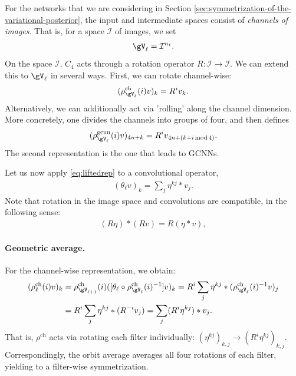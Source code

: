 \documentclass{article}
\begin{document}
For the networks that we are considering in Section \ref{sec:symmetrization-of-the-variational-posterior}, the input and intermediate spaces consist of \emph{channels of images}. That is, for a space $\mathcal{I}$ of images, we set
\begin{align}
    \gV_\ell = \mathcal{I}^{n_\ell}.
\end{align}
On the space $\mathcal{I}$, $C_4$ acts through a rotation operator $R:\mathcal{I}\to \mathcal{I}$. We can extend this to $\gV_\ell$ in several ways. First, we can rotate channel-wise:
\begin{align}
    (\rho_{\gV_\ell}^{\mathrm{ch}} (i) v)_k = R^{i} v_k.
\end{align}
Alternatively, we can additionally act via 'rolling' along the channel dimension. More concretely, one divides the channels into groups of four, and then defines
\begin{align}
    (\rho_{\gV_\ell}^{\mathrm{gcnn}}(i) v)_{4n + k} = R^iv_{4n +(k+i \, \mathrm{mod} \, 4)}.
\end{align}
The second representation is the one that leads to GCNNs.

Let us now apply \eqref{eq:liftedrep} to a convolutional operator,
\begin{align}
    (\theta_\ell v)_k = \sum_j \eta^{kj}*v_j.
\end{align}
Note that rotation in the image space and convolutions are compatible, in the following sense:
\begin{align}
    (R\eta)*(Rv) = R(\eta*v),
\end{align}

\paragraph{Geometric average.} For the channel-wise representation, we obtain:
\begin{align}
    (\rho^{\mathrm{ch}}_{\ell}(i)v)_k &= \rho_{\gV_{\ell+1}}^{\mathrm{ch}}(i) ([\theta_\ell \circ \rho_{\gV_\ell}^{\mathrm{ch}}(i)^{-1}]v)_k = R^i\sum_{j}\eta^{kj}*(\rho_{\gV_\ell}^{\mathrm{ch}}(i)^{-1}v)_j \\
    &= R^i\sum_{j}\eta^{kj}*(R^{-i}v_j) = \sum_{j}(R^i\eta^{kj})*v_j. 
\end{align}
That is, $\rho^{\mathrm{ch}}$ acts via rotating each filter individually: $(\eta^{kj})_{k,j} \to (R^i\eta^{kj})_{k,j}$. Correspondingly, the orbit average averages all four rotations of each filter, yielding to a filter-wise symmetrization.
\end{document}
